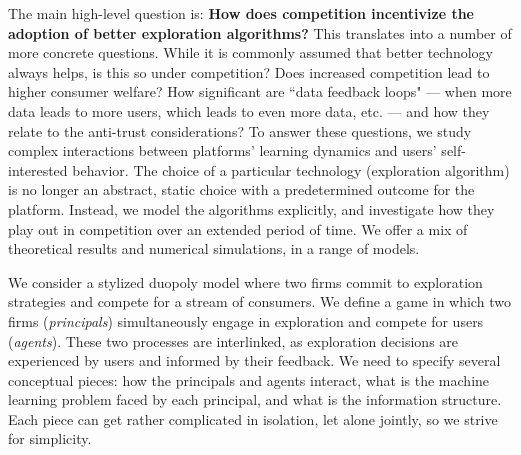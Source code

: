 \documentclass[10pt]{article}
\begin{document}
The main high-level question is:
\textbf{How does competition incentivize the adoption of better exploration algorithms?}
This translates into a number of more concrete questions. While it is commonly assumed that better technology always helps, is this so under competition? Does increased competition lead to higher consumer welfare? How significant are ``data feedback loops" --- when more data leads to more users, which leads to even more data, etc. --- and how they relate to the anti-trust considerations?
To answer these questions, we study complex interactions between platforms' learning dynamics and users' self-interested behavior. The choice of a particular technology (exploration algorithm) is no longer an abstract, static choice with a predetermined outcome for the platform. Instead, we model the algorithms explicitly, and investigate how they play out in competition over an extended period of time.
We offer a mix of theoretical results and numerical simulations, in a range of models.







 We consider a stylized duopoly model where two firms commit to exploration strategies and compete for a stream of consumers. We define a game in which two firms (\emph{principals}) simultaneously engage in exploration and compete for users (\emph{agents}). These two processes are interlinked, as exploration decisions are experienced by users and informed by their feedback. We need to specify several conceptual pieces: how the principals and agents interact, what is the machine learning problem faced by each principal, and what is the information structure. Each piece can get rather complicated in isolation, let alone jointly, so we strive for simplicity.
\end{document}
